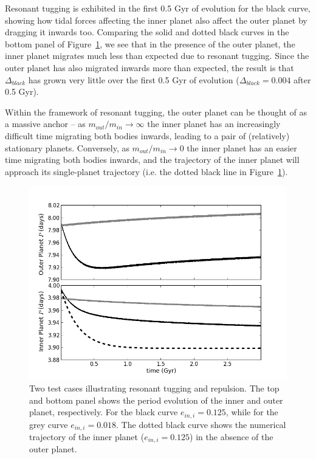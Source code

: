 Resonant tugging is exhibited in the first 0.5 Gyr of evolution for the black curve, showing how tidal forces affecting the inner planet also affect the outer planet by dragging it inwards too. 
Comparing the solid and dotted black curves in the bottom panel of Figure~\ref{fig:repulse}, we see that in the presence of the outer planet, the inner planet migrates much less than expected due to resonant tugging. 
Since the outer planet has also migrated inwards more than expected, the result is that $\Delta_{black}$ has grown very little over the first 0.5 Gyr of evolution ($\Delta_{black} = 0.004$ after 0.5 Gyr). 

Within the framework of resonant tugging, the outer planet can be thought of as a massive anchor -- as $m_{out} / m_{in} \rightarrow \infty$ the inner planet has an increasingly difficult time migrating both bodies inwards, leading to a pair of (relatively) stationary planets. 
Conversely, as $m_{out} / m_{in} \rightarrow 0$ the inner planet has an easier time migrating both bodies inwards, and the trajectory of the inner planet will approach its single-planet trajectory (i.e. the dotted black line in Figure~\ref{fig:repulse}).

\begin{figure}
\centerline{\includegraphics[trim=0cm 0cm 1cm 1cm, scale=0.48]{chap3/tugg_v_repulse_July20.png}}
\caption{ Two test cases illustrating resonant tugging and repulsion.
The top and bottom panel shows the period evolution of the inner and outer planet, respectively.
For the black curve $e_{in,i} = 0.125$, while for the grey curve $e_{in,i} = 0.018$. 
The dotted black curve shows the numerical trajectory of the inner planet ($e_{in,i} = 0.125$) in the absence of the outer planet.
}
\label{fig:repulse}
\end{figure}

